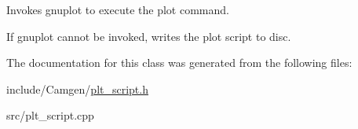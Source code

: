Invokes gnuplot to execute the plot command. 

If gnuplot cannot be invoked, writes the plot script to disc. 

The documentation for this class was generated from the following files\+:\begin{DoxyCompactItemize}
\item 
include/\+Camgen/\hyperlink{a00723}{plt\+\_\+script.\+h}\item 
src/plt\+\_\+script.\+cpp\end{DoxyCompactItemize}
